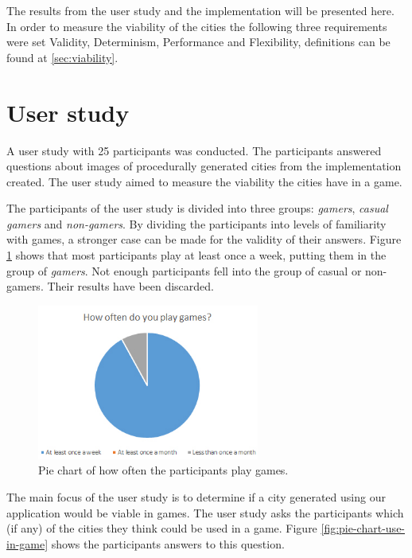 The results from the user study and the implementation will be presented here. In order to measure the viability of the cities the following three requirements were set Validity, Determinism, Performance and Flexibility, definitions can be found at \ref{sec:viability}.
	
\section{User study}
A user study with 25 participants was conducted. The participants answered questions about images of procedurally generated cities from the implementation created. The user study aimed to measure the viability the cities have in a game.
	

\par
The participants of the user study is divided into three groups: \textit{gamers}, \textit{casual gamers} and \textit{non-gamers}. By dividing the participants into levels of familiarity with games, a stronger case can be made for the validity of their answers. Figure \ref{fig:pie-chart-often-play} shows that most participants play at least once a week, putting them in the group of \textit{gamers}. Not enough participants fell into the group of casual or non-gamers. Their results have been discarded.

\begin{figure}[h]
	\centering
	\includegraphics[width=0.65\textwidth]{"Images/OftenPlay"}
	\caption{Pie chart of how often the participants play games.}
	\label{fig:pie-chart-often-play}
\end{figure}

The main focus of the user study is to determine if a city generated using our application would be viable in games. The user study asks the participants which (if any) of the cities they think could be used in a game. Figure \ref{fig:pie-chart-use-in-game} shows the participants answers to this question.

